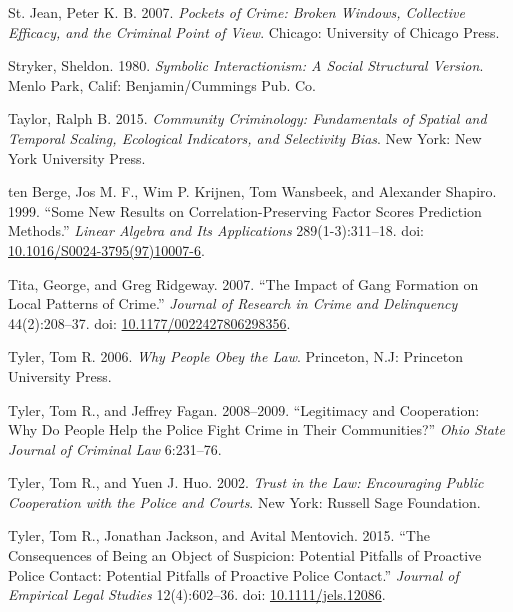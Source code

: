 \documentclass [11pt, proquest] {uwthesis}[2015/03/03]
\newlength{\cslhangindent}
\newenvironment{CSLReferences}[2]%
{\setlength{\parindent}{0pt}%
\everypar{\setlength{\hangindent}{\cslhangindent}}\ignorespaces}%
{\par}
\begin{document}
\begin{CSLReferences}{1}{0}
\leavevmode\hypertarget{ref-st.jeanPocketsCrimeBroken2007}{}%
St. Jean, Peter K. B. 2007. \emph{Pockets of Crime: Broken Windows, Collective Efficacy, and the Criminal Point of View}. {Chicago}: {University of Chicago Press}.

\leavevmode\hypertarget{ref-strykerSymbolicInteractionismSocial1980}{}%
Stryker, Sheldon. 1980. \emph{Symbolic Interactionism: A Social Structural Version}. {Menlo Park, Calif}: {Benjamin/Cummings Pub. Co}.

\leavevmode\hypertarget{ref-taylorCommunityCriminologyFundamentals2015}{}%
Taylor, Ralph B. 2015. \emph{Community {Criminology}: {Fundamentals} of {Spatial} and {Temporal Scaling}, {Ecological Indicators}, and {Selectivity Bias}}. {New York}: {New York University Press}.

\leavevmode\hypertarget{ref-tenbergeNewResultsCorrelationpreserving1999}{}%
ten Berge, Jos M. F., Wim P. Krijnen, Tom Wansbeek, and Alexander Shapiro. 1999. {``Some New Results on Correlation-Preserving Factor Scores Prediction Methods.''} \emph{Linear Algebra and Its Applications} 289(1-3):311--18. doi: \href{https://doi.org/10.1016/S0024-3795(97)10007-6}{10.1016/S0024-3795(97)10007-6}.

\leavevmode\hypertarget{ref-titaImpactGangFormation2007}{}%
Tita, George, and Greg Ridgeway. 2007. {``The {Impact} of {Gang Formation} on {Local Patterns} of {Crime}.''} \emph{Journal of Research in Crime and Delinquency} 44(2):208--37. doi: \href{https://doi.org/10.1177/0022427806298356}{10.1177/0022427806298356}.

\leavevmode\hypertarget{ref-tylerWhyPeopleObey2006}{}%
Tyler, Tom R. 2006. \emph{Why People Obey the Law}. {Princeton, N.J}: {Princeton University Press}.

\leavevmode\hypertarget{ref-tylerLegitimacyCooperationWhy2008}{}%
Tyler, Tom R., and Jeffrey Fagan. 2008--2009. {``Legitimacy and {Cooperation}: {Why Do People Help} the {Police Fight Crime} in {Their Communities}?''} \emph{Ohio State Journal of Criminal Law} 6:231--76.

\leavevmode\hypertarget{ref-tylerTrustLawEncouraging2002a}{}%
Tyler, Tom R., and Yuen J. Huo. 2002. \emph{Trust in the Law: Encouraging Public Cooperation with the Police and Courts}. {New York}: {Russell Sage Foundation}.

\leavevmode\hypertarget{ref-tylerConsequencesBeingObject2015}{}%
Tyler, Tom R., Jonathan Jackson, and Avital Mentovich. 2015. {``The {Consequences} of {Being} an {Object} of {Suspicion}: {Potential Pitfalls} of {Proactive Police Contact}: {Potential Pitfalls} of {Proactive Police Contact}.''} \emph{Journal of Empirical Legal Studies} 12(4):602--36. doi: \href{https://doi.org/10.1111/jels.12086}{10.1111/jels.12086}.


\end{CSLReferences}
\end{document}
